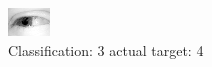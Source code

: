 \begin{figure}[h!]
\begin{center}
\includegraphics[width=0.60\columnwidth]{figures/ID2491_class_3_target_4.png}
\end{center}
\caption{ Classification: 3 actual target: 4}
\label{fig:ID2491_class_3_target_4}
\end{figure}
